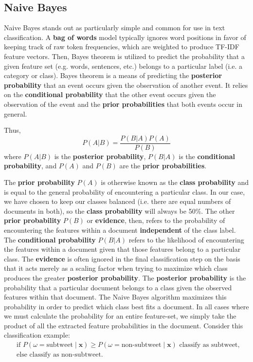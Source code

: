 \documentclass[11pt, twoside, reqno]{book}
\begin{document}
\subsection{Naive Bayes}
\label{naive_bayes}

Naive Bayes stands out as particularly simple and common for use in text classification. A \textbf{bag of words} model typically ignores word positions in favor of keeping track of raw token frequencies, which are weighted to produce TF-IDF feature vectors. Then, Bayes theorem is utilized to predict the probability that a given feature set (e.g. words, sentences, etc.) belongs to a particular label (i.e. a category or class). Bayes theorem is a means of predicting the \textbf{posterior probability} that an event occurs given the observation of another event. It relies on the \textbf{conditional probability} that the other event occurs given the observation of the event and the \textbf{prior probabilities} that both events occur in general.

\noindent
Thus,
\[{P(A|B)}=\frac{P(B|A)P(A)}{P(B)}\] 
where $P(A|B)$ is the \textbf{posterior probability}, $P(B|A)$ is the \textbf{conditional probability}, and $P(A)$ and $P(B)$ are the \textbf{prior probabilities}.

The \textbf{prior probability} $P(A)$ is otherwise known as the \textbf{class probability} and is equal to the general probability of encountering a particular class. In our case, we have chosen to keep our classes balanced (i.e. there are equal numbers of documents in both), so the \textbf{class probability} will always be 50\%. The other \textbf{prior probability} $P(B)$ or \textbf{evidence}, then, refers to the probability of encountering the features within a document \textbf{independent} of the class label. The \textbf{conditional probability} $P(B|A)$ refers to the likelihood of encountering the features within a document given that those features belong to a particular class. The \textbf{evidence} is often ignored in the final classification step on the basis that it acts merely as a scaling factor when trying to maximize which class produces the greater \textbf{posterior probability}. The \textbf{posterior probability} is the probability that a particular document belongs to a class given the observed features within that document. The Naive Bayes algorithm maximizes this probability in order to predict which class best fits a document. In all cases where we must calculate the probability for an entire feature-set, we simply take the product of all the extracted feature probabilities in the document. Consider this classification example:
\[
\begin{split} 
	& \text{if } P(  \omega = \text{subtweet} \mid \textbf{x}) \ge P(\omega = \text{non-subtweet} \mid \textbf{x})  \text{ classify as subtweet, }\\
	&  \text{else classify as non-subtweet. }
\end{split}
\]
\end{document}
